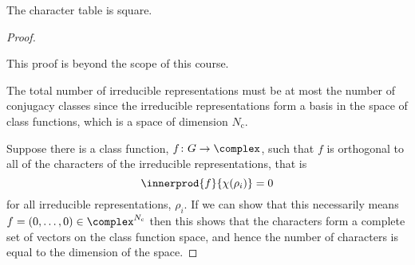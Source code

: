 \documentclass[fleqn]{NotesClass}
\begin{document}
    \begin{thm}{}{}
        The character table is square.
        
        \begin{proof}
            \begin{rmk}
                This proof is beyond the scope of this course.
            \end{rmk}
            \vspace{1ex}
            The total number of irreducible representations must be at most the number of conjugacy classes since the irreducible representations form a basis in the space of class functions, which is a space of dimension  \(N_\mathrm{c}\).
            
            Suppose there is a class function, \(f \colon G \to \complex\), such that \(f\) is orthogonal to all of the characters of the irreducible representations, that is
            \begin{equation}
                \innerprod{f}{\chi(\rho_i)} = 0
            \end{equation}
            for all irreducible representations, \(\rho_i\).
            If we can show that this necessarily means \(f = (0, \dotsc, 0) \in \complex^{N_{\mathrm{c}}}\) then this shows that the characters form a complete set of vectors on the class function space, and hence the number of characters is equal to the dimension of the space.
            

\end{proof}
\end{thm}
\end{document}
